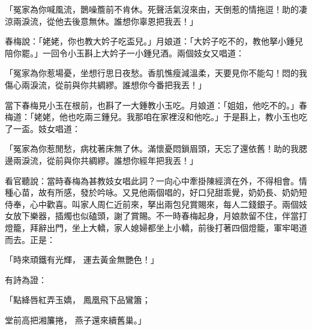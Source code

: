 \begin{showcontents}{}
「冤家為你喊風流，鵲噪簷前不肯休。死聲活氣沒來由，天倒惹的情拖逗！助的凄涼兩淚流，從他去後意無休。誰想你辜恩把我丟！」

春梅說：「姥姥，你也教大妗子吃盃兒。」月娘道：「大妗子吃不的，教他拏小鍾兒陪你罷。」一回令小玉斟上大妗子一小鍾兒酒。兩個妓女又唱道：

「冤家為你惹場憂，坐想行思日夜愁。香肌憔瘦減溫柔，天要見你不能勾！悶的我傷心兩淚流，從前與你共綢繆。誰想你今番把我丟！」

當下春梅見小玉在根前，也斟了一大鍾教小玉吃。月娘道：「姐姐，他吃不的。」春梅道：「姥姥，他也吃兩三鍾兒。我那咱在家裡沒和他吃。」于是斟上，教小玉也吃了一盃。妓女唱道：

「冤家為你惹閒愁，病枕著床無了休。滿懷憂悶鎖眉頭，天忘了還依舊！助的我腮邊兩淚流，從前與你共綢繆。誰想你經年把我丟！」

看官聽說：當時春梅為甚教妓女唱此詞？一向心中牽掛陳經濟在外，不得相會。情種心苗，故有所感，發於吟咏。又見他兩個唱的，好口兒甜乖覺，奶奶長、奶奶短侍奉，心中歡喜。叫家人周仁近前來，拏出兩包兒賞賜來，每人二錢銀子。兩個妓女放下樂器，插燭也似磕頭，謝了賞賜。不一時春梅起身，月娘款留不住，伴當打燈籠，拜辭出門，坐上大轎，家人媳婦都坐上小轎，前後打著四個燈籠，軍牢喝道而去。正是：

「時來頑鐵有光輝，  運去黃金無艷色！」

有詩為證：

「點絳唇紅弄玉嬌，  鳳凰飛下品鸞簫；

堂前高把湘簾捲，  燕子還來續舊巢。」


\end{showcontents}

